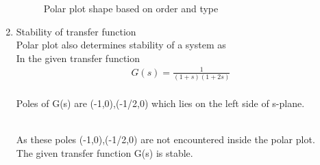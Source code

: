 \begin{enumerate}[label=\thesection.\arabic*.,ref=\thesection.\theenumi]
\begin{figure}
    \caption{Polar plot shape based on order and type}
    \label{fig:Graph}
\end{figure}
\item
Stability of transfer function\\
Polar plot also  determines stability of a system as\\
In the given transfer function\\
\begin{align}
G(s) = \frac{1}{(1+s)(1+2s)}
\end{align}
\\
Poles of G(s) are (-1,0),(-1/2,0) which lies on the left side of s-plane.

\\
As these poles (-1,0),(-1/2,0) are not encountered inside the polar plot.\\
The given transfer function G(s) is stable.






\end{enumerate}
